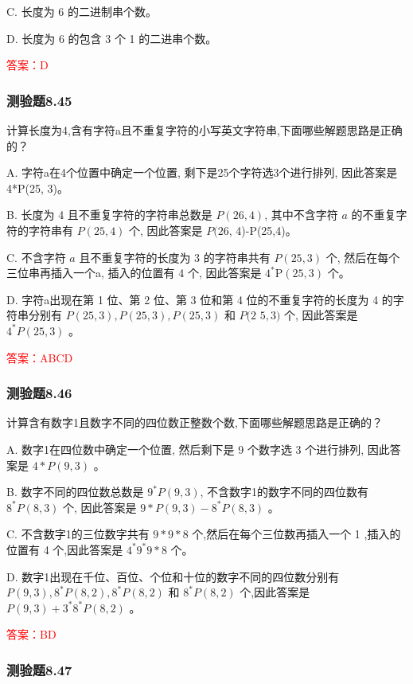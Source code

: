 \documentclass[UTF8, heading=true]{ctexart}
\begin{document}
C. 长度为 6 的二进制串个数。

D. 长度为 6 的包含 3 个 1 的二进串个数。

\textcolor{red}{答案：D}

\subsubsection{测验题8.45}

计算长度为4,含有字符a且不重复字符的小写英文字符串,下面哪些解题思路是正确的？

A. 字符a在4个位置中确定一个位置, 剩下是25个字符选3个进行排列, 因此答案是4*P(25, 3)。

B. 长度为 4 且不重复字符的字符串总数是 $P(26,4)$, 其中不含字符 $a$ 的不重复字符的字符串有 $P(25,4)$ 个, 因此答案是 $P(26$, 4)-P(25,4)。

C. 不含字符 $a$ 且不重复字符的长度为 3 的字符串共有 $P(25,3)$ 个, 然后在每个三位串再插入一个a, 插入的位置有 4 个, 因此答案是 $4^* \mathrm{P}(25,3)$ 个。

D. 字符a出现在第 1 位、第 2 位、第 3 位和第 4 位的不重复字符的长度为 4 的字符串分别有 $P(25,3), P(25,3), P(25,3)$ 和 $P(2$ $5,3)$ 个, 因此答案是 $4^* P(25,3)$ 。


\textcolor{red}{答案：ABCD}

\subsubsection{测验题8.46}

计算含有数字1且数字不同的四位数正整数个数,下面哪些解题思路是正确的？

A. 数字1在四位数中确定一个位置, 然后剩下是 9 个数字选 3 个进行排列, 因此答案是 $4 * P(9,3)$ 。

B. 数字不同的四位数总数是 $9^* P(9,3)$, 不含数字1的数字不同的四位数有 $8^* P(8,3)$ 个, 因此答案是 $9 * P(9,3)-8^* P(8,3)$ 。

C. 不含数字1的三位数字共有 $9 * 9 * 8$ 个,然后在每个三位数再插入一个 1 ,插入的位置有 4 个,因此答案是 $4^* 9^* 9 * 8$ 个。

D. 数字1出现在千位、百位、个位和十位的数字不同的四位数分别有 $P(9,3), 8^* P(8,2), 8^* P(8,2)$ 和 $8^* P(8,2)$ 个,因此答案是 $P(9,3)+3^* 8^* P(8,2)$ 。

\textcolor{red}{答案：BD}

\subsubsection{测验题8.47}
\end{document}
